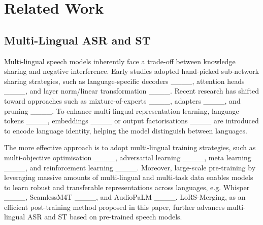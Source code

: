 \section{Related Work}
\subsection{Multi-Lingual ASR and ST}
Multi-lingual speech models inherently face a trade-off between knowledge sharing and negative interference.
Early studies adopted hand-picked sub-network sharing strategies, such as language-specific decoders ____, attention heads ____, and layer norm/linear transformation ____.
Recent research has shifted toward approaches such as mixture-of-experts ____, adapters ____, and pruning ____.
To enhance multi-lingual representation learning, language tokens ____, embeddings ____ or output factorisations ____ are introduced to encode language identity, helping the model distinguish between languages.

The more effective approach is to adopt multi-lingual training strategies, such as multi-objective optimisation ____, adversarial learning ____, meta learning ____, and reinforcement learning ____.
Moreover, large-scale pre-training by leveraging massive amounts of multi-lingual and multi-task data enables models to learn robust and transferable representations across languages, e.g. Whisper ____, SeamlessM4T ____, and AudioPaLM ____. LoRS-Merging, as an efficient post-training method proposed in this paper, further advances multi-lingual ASR and ST based on pre-trained speech models.


